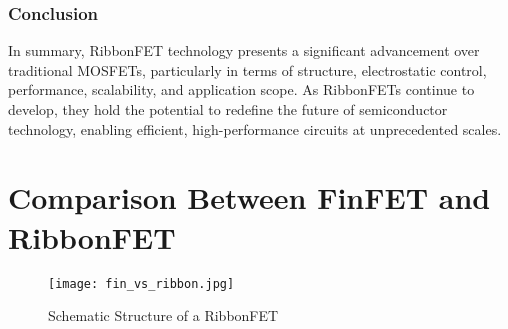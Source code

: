 \documentclass[12pt]{report}
\begin{document}
\begin{titlepage}
\subsection{Conclusion}

In summary, RibbonFET technology presents a significant advancement over traditional MOSFETs, particularly in terms of structure, electrostatic control, performance, scalability, and application scope. As RibbonFETs continue to develop, they hold the potential to redefine the future of semiconductor technology, enabling efficient, high-performance circuits at unprecedented scales.



\chapter{Comparison Between FinFET and RibbonFET}

\begin{figure}[h]
    \centering
    \texttt{[image: fin\_vs\_ribbon.jpg]} %
    \caption{Schematic Structure of a RibbonFET}
    \label{fig:ribbonfet_structure}
\end{figure}



\end{titlepage}
\end{document}
